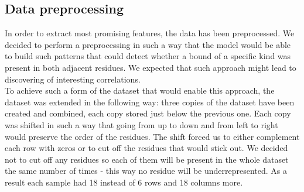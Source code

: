 \documentclass[a4paper,10pt]{report}
\begin{document}
           
	    


	\subsection{Data preprocessing}\label{sec:data_processing}
	  In order to extract most promising features, the data has been preprocessed. We decided to perform a preprocessing in such a way that the model would be able to build such patterns that could detect whether a bound of a specific kind was present in both adjacent residues. We expected that such approach might lead to discovering of interesting correlations.\\
	  
	  To achieve such a form of the dataset that would enable this approach, the dataset was extended in the following way: three copies of the dataset have been created and combined, each copy stored just below the previous one. Each copy was shifted in such a way that going from up to down and from left to right would preserve the order of the residues. The shift forced us to either complement each row with zeros or to cut off the residues that would stick out. We decided not to cut off any residues so each of them will be present in the whole dataset the same number of times - this way no residue will be underrepresented. As a result each sample had 18 instead of 6 rows and 18 columns more.\\
	  
\end{document}
